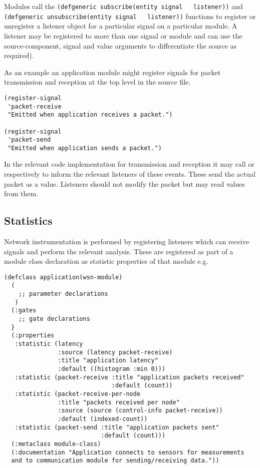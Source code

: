 \documentclass[a4paper,11pt,twoside,openany]{report}
\begin{document}
Modules call the \lstinline{(defgeneric subscribe(entity signal
  listener))} and \lstinline{(defgeneric unsubscribe(entity signal
  listener))} functions to register or unregister a listener object
for a particular signal on a particular module. A listener may be
registered to more than one signal or module and can use the
source-component, signal and value arguments to differentiate the
source as required).

As an example an application module might register signals for packet
transmission and reception at the top level in the source file.

\begin{lstlisting}
(register-signal
 'packet-receive
 "Emitted when application receives a packet.")

(register-signal
 'packet-send
 "Emitted when application sends a packet.")
\end{lstlisting}

In the relevant code implementation for transmission and reception it may call
 or  respectively to inform the relevant listeners of
these events. These send the actual packet as a value. Listeners
should not modify the packet but may read values from them.

\subsection{Statistics}

Network instrumentation is performed by registering listeners which
can receive signals and perform the relevant analysis. These are
registered as part of a module class declaration as statistic
properties of that module e.g.

\begin{lstlisting}
(defclass application(wsn-module)
  ( 
    ;; parameter declarations
   )
  (:gates
    ;; gate declarations
  }
  (:properties
   :statistic (latency
               :source (latency packet-receive)
               :title "application latency"
               :default ((histogram :min 0)))
   :statistic (packet-receive :title "application packets received"
                              :default (count))
   :statistic (packet-receive-per-node
               :title "packets received per node"
               :source (source (control-info packet-receive))
               :default (indexed-count))
   :statistic (packet-send :title "application packets sent"
                           :default (count)))
  (:metaclass module-class)
  (:documentation "Application connects to sensors for measurements
  and to communication module for sending/receiving data."))
\end{lstlisting}
\end{document}
